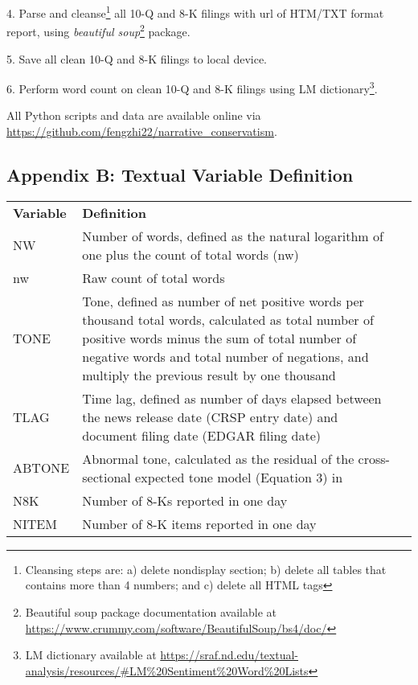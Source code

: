 4. Parse and cleanse\footnote{Cleansing steps are: a) delete nondisplay section; b) delete all tables that contains more than 4 numbers; and c) delete all HTML tags} all 10-Q and 8-K filings with url of HTM/TXT format report, using \textit{beautiful soup}\footnote{Beautiful soup package documentation available at \url{https://www.crummy.com/software/BeautifulSoup/bs4/doc/}} package. 

5. Save all clean 10-Q and 8-K filings to local device. 

6. Perform word count on clean 10-Q and 8-K filings using LM dictionary\footnote{LM dictionary available at \url{https://sraf.nd.edu/textual-analysis/resources/\#LM\%20Sentiment\%20Word\%20Lists}}. 

All Python scripts and data are available online via \url{https://github.com/fengzhi22/narrative_conservatism}.

\subsection*{Appendix B: Textual Variable Definition}
\label{appb}
\begin{table}[H]
	\centering
	\begin{tabular}{lp{15cm}p{15cm}}
		\textbf{Variable} & \textbf{Definition} \\
		NW & Number of words, defined as the natural logarithm of one plus the count of total words (nw)\\
		nw & Raw count of total words\\
		TONE & Tone, defined as number of net positive words per thousand total words, calculated as total number of positive words minus the sum of total number of negative words and total number of negations, and multiply the previous result by one thousand\\
		TLAG & Time lag, defined as number of days elapsed between the news release date (CRSP entry date) and document filing date (EDGAR filing date)\\
		ABTONE & Abnormal tone, calculated as the residual of the cross-sectional expected tone model (Equation 3) in \citet*{huangToneManagement2014}\\
		N8K & Number of 8-Ks reported in one day\\
		NITEM & Number of 8-K items reported in one day\\
		
	\end{tabular}%
\end{table}%

